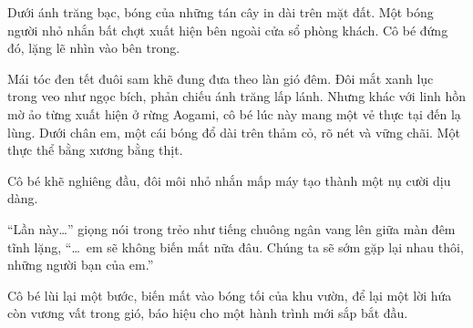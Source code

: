 \documentclass[../main.tex]{subfiles}
\begin{document}
Dưới ánh trăng bạc, bóng của những tán cây in dài trên mặt đất. Một bóng người nhỏ nhắn bất chợt xuất hiện bên ngoài cửa sổ phòng khách. Cô bé đứng đó, lặng lẽ nhìn vào bên trong.

Mái tóc đen tết đuôi sam khẽ đung đưa theo làn gió đêm. Đôi mắt xanh lục trong veo như ngọc bích, phản chiếu ánh trăng lấp lánh. Nhưng khác với linh hồn mờ ảo từng xuất hiện ở rừng Aogami, cô bé lúc này mang một vẻ thực tại đến lạ lùng. Dưới chân em, một cái bóng đổ dài trên thảm cỏ, rõ nét và vững chãi. Một thực thể bằng xương bằng thịt.

Cô bé khẽ nghiêng đầu, đôi môi nhỏ nhắn mấp máy tạo thành một nụ cười dịu dàng.

``Lần này\dots'' giọng nói trong trẻo như tiếng chuông ngân vang lên giữa màn đêm tĩnh lặng, ``\dots\ em sẽ không biến mất nữa đâu. Chúng ta sẽ sớm gặp lại nhau thôi, những người bạn của em.''

Cô bé lùi lại một bước, biến mất vào bóng tối của khu vườn, để lại một lời hứa còn vương vất trong gió, báo hiệu cho một hành trình mới sắp bắt đầu.
\end{document}
